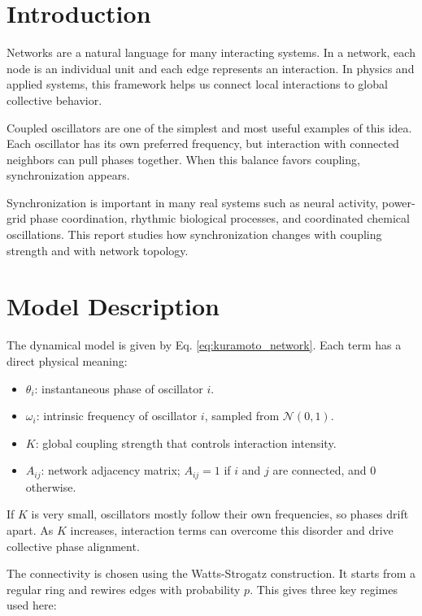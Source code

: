 \documentclass[12pt]{article}
\begin{document}
\section{Introduction}

Networks are a natural language for many interacting systems. In a network, each node is an individual unit and each edge represents an interaction. In physics and applied systems, this framework helps us connect local interactions to global collective behavior.

Coupled oscillators are one of the simplest and most useful examples of this idea. Each oscillator has its own preferred frequency, but interaction with connected neighbors can pull phases together. When this balance favors coupling, synchronization appears.

Synchronization is important in many real systems such as neural activity, power-grid phase coordination, rhythmic biological processes, and coordinated chemical oscillations. This report studies how synchronization changes with coupling strength and with network topology.

\section{Model Description}

The dynamical model is given by Eq. \eqref{eq:kuramoto_network}. Each term has a direct physical meaning:

\begin{itemize}
	\item $\theta_i$: instantaneous phase of oscillator $i$.
	\item $\omega_i$: intrinsic frequency of oscillator $i$, sampled from $\mathcal{N}(0,1)$.
	\item $K$: global coupling strength that controls interaction intensity.
	\item $A_{ij}$: network adjacency matrix; $A_{ij}=1$ if $i$ and $j$ are connected, and $0$ otherwise.
\end{itemize}

If $K$ is very small, oscillators mostly follow their own frequencies, so phases drift apart. As $K$ increases, interaction terms can overcome this disorder and drive collective phase alignment.

The connectivity is chosen using the Watts-Strogatz construction. It starts from a regular ring and rewires edges with probability $p$. This gives three key regimes used here:
\end{document}
